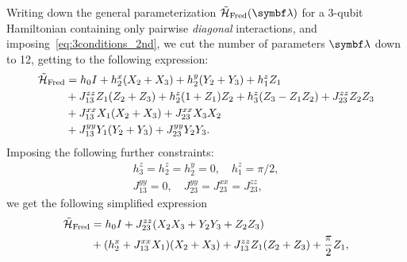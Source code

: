 Writing down the general parameterization $\HTildeFred(\bs\lambda)$ for a 3-qubit Hamiltonian containing only pairwise \emph{diagonal} interactions,
and imposing~\cref{eq:3conditions_2nd}, we cut the number of parameters $\bs\lambda$ down to 12, getting to the following expression:
\begin{equation}
\begin{aligned}
    \tilde{{\mathcal{H}}}_{\operatorname{Fred}} &=
    h_0 I
    + h_2^x (X_2 + X_3)
    + h_2^y (Y_2 + Y_3)
    + h_1^z Z_1 \\
    &+ J_{13}^{zz} Z_1(Z_2 + Z_3)
    + h_2^z (1 + Z_1) Z_2
    + h_3^z (Z_3 - Z_1 Z_2)
    + J_{23}^{zz} Z_2 Z_3 \\
    &+ J_{13}^{xx} X_1(X_2 + X_3)
    + J_{23}^{xx} X_3 X_2 \\
    &+ J_{13}^{yy} Y_1 (Y_2 + Y_3)
    + J_{23}^{yy} Y_2 Y_3.
\end{aligned}
\end{equation}
Imposing the following further constraints:
\begin{equation}
\begin{gathered}
    h_3^z = h_2^z = h_2^y = 0, \quad
    h_1^z = \pi/2, \\
    J_{13}^{yy} = 0,\quad
    J_{23}^{yy} = J_{23}^{xx} = J_{23}^{zz},
\end{gathered}
\end{equation}
we get the following simplified expression
\begin{equation}
\begin{aligned}
    \tilde{{\mathcal{H}}}_{\operatorname{Fred}} &=
    h_0 I
    + J_{23}^{zz} (X_2 X_3 + Y_2 Y_3 + Z_2 Z_3) \\
    &+ (h_2^x + J_{13}^{xx} X_1)(X_2 + X_3)
    + J_{13}^{zz} Z_1 (Z_2 + Z_3)
    + \frac{\pi}{2}  Z_1,
\end{aligned}
\end{equation}

